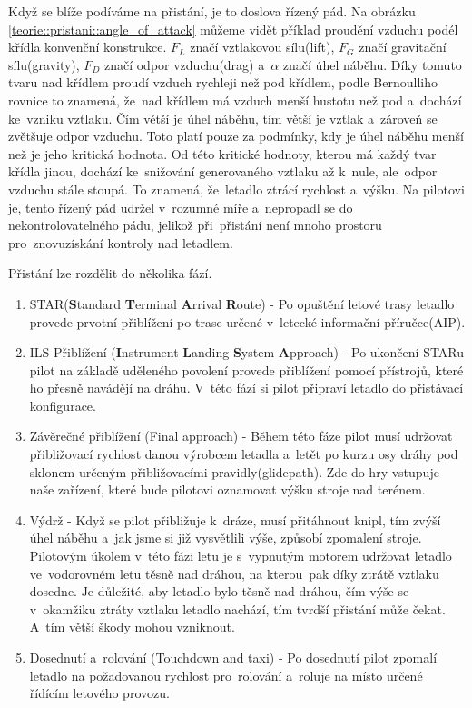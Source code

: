 		Když se blíže podíváme na přistání, je to doslova řízený pád. Na obrázku \ref{teorie::pristani::angle_of_attack} můžeme vidět příklad proudění vzduchu podél křídla konvenční konstrukce. $F_L$ značí vztlakovou sílu(lift), $F_G$ značí gravitační sílu(gravity), $F_D$ značí odpor vzduchu(drag) a~$\alpha$ značí úhel náběhu. Díky tomuto tvaru nad křídlem proudí vzduch rychleji než pod křídlem, podle Bernoulliho rovnice to znamená, že~nad křídlem má vzduch menší hustotu než pod a~dochází ke~vzniku vztlaku. Čím větší je úhel náběhu, tím větší je vztlak a~zároveň se zvětšuje odpor vzduchu. Toto platí pouze za podmínky, kdy je úhel náběhu menší než je jeho kritická hodnota. Od této kritické hodnoty, kterou má každý tvar křídla jinou, dochází ke~snižování generovaného vztlaku až k~nule, ale~odpor vzduchu stále stoupá. To znamená, že~letadlo ztrácí rychlost a~výšku. Na pilotovi je, tento řízený pád udržel v~rozumné míře a~nepropadl se do nekontrolovatelného pádu, jelikož při~přistání není mnoho prostoru pro~znovuzískání kontroly nad letadlem.\par
		Přistání lze rozdělit do několika fází\cite{landingPhases}\cite{ICAO}.
		
		\begin{enumerate}
			\item STAR(\textbf{S}tandard \textbf{T}erminal \textbf{A}rrival \textbf{R}oute) - Po opuštění letové trasy letadlo provede prvotní přiblížení po trase určené v~letecké informační příručce(AIP). 
			
			\item ILS Přiblížení (\textbf{I}nstrument \textbf{L}anding \textbf{S}ystem \textbf{A}pproach) - Po ukončení STARu pilot na základě uděleného povolení provede přiblížení pomocí přístrojů, které ho přesně navádějí na dráhu. V~této fází si pilot připraví letadlo do přistávací konfigurace.
		
			\item Závěrečné přiblížení (Final approach) - Během této fáze pilot musí udržovat přibližovací rychlost danou výrobcem letadla a~letět po kurzu osy dráhy pod sklonem určeným přibližovacími pravidly(glidepath). Zde do hry vstupuje naše zařízení, které bude pilotovi oznamovat výšku stroje nad terénem.
					
			\item Výdrž - Když se pilot přibližuje k~dráze, musí přitáhnout knipl, tím zvýší úhel náběhu a~jak jsme si již vysvětlili výše, způsobí zpomalení stroje. Pilotovým úkolem v~této fázi letu je s~vypnutým motorem udržovat letadlo ve~vodorovném letu těsně nad dráhou, na kterou~pak díky ztrátě vztlaku dosedne. Je důležité, aby letadlo bylo těsně nad dráhou, čím výše se v~okamžiku ztráty vztlaku letadlo nachází, tím tvrdší přistání může čekat. A~tím větší škody mohou vzniknout.
					
			\item Dosednutí a~rolování (Touchdown and taxi) - Po dosednutí pilot zpomalí letadlo na požadovanou rychlost pro~rolování a~roluje na místo určené řídícím letového provozu. 
		\end{enumerate}
				
